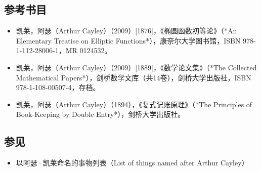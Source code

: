 \subsection{参考书目}  
\begin{itemize}
\item 凯莱，阿瑟（Arthur Cayley）（2009）[1876]，《椭圆函数初等论》（*An Elementary Treatise on Elliptic Functions*），康奈尔大学图书馆，ISBN 978-1-112-28006-1，MR 0124532。  
\item 凯莱，阿瑟（Arthur Cayley）（2009）[1889]，《数学论文集》（*The Collected Mathematical Papers*），剑桥数学文库（共14卷），剑桥大学出版社，ISBN 978-1-108-00507-4，存档。  
\item 凯莱，阿瑟（Arthur Cayley）（1894），《复式记账原理》（*The Principles of Book-Keeping by Double Entry*），剑桥大学出版社。
\end{itemize}
\subsection{参见} 
\begin{itemize}
\item 以阿瑟·凯莱命名的事物列表（List of things named after Arthur Cayley）
\end{itemize}  

